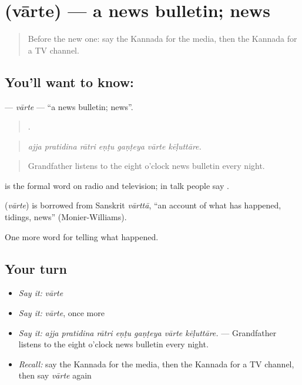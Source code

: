\section[\texorpdfstring{\kn{ವಾರ್ತೆ} (vārte)}{ವಾರ್ತೆ (vārte)}]{ (vārte) — a news bulletin; news}

\label{lesson:KA-C329-varte}



\begin{quote}
Before the new one: say the Kannada for the media, then the Kannada for a TV channel.
\end{quote}

\subsection*{You'll want to know: }
\textbf{} — \emph{vārte} — \textquotedblleft{}a news bulletin; news\textquotedblright{}.

\begin{quote}
      .
\end{quote}

\begin{quote}
\emph{ajja pratidina rātri eṇṭu gaṇṭeya vārte kēḷuttāre.}
\end{quote}

\begin{quote}
Grandfather listens to the eight o'clock news bulletin every night.
\end{quote}

 is the formal word on radio and television; in talk people say .

\begin{cousinweb}
\textbf{} (\emph{vārte}) is borrowed from Sanskrit \emph{vārttā}, \textquotedblleft{}an account of what has happened, tidings, news\textquotedblright{} (Monier-Williams).
\end{cousinweb}

\begin{grammarlens}[title={What you've built}]
One more word for telling what happened.
\end{grammarlens}

\subsection*{Your turn}
\begin{itemize}
\raggedright
  \item \emph{Say it:} \emph{vārte}
  \item \emph{Say it:} \emph{vārte}, once more
  \item \emph{Say it:} \emph{ajja pratidina rātri eṇṭu gaṇṭeya vārte kēḷuttāre.} — Grandfather listens to the eight o'clock news bulletin every night.
  \item \emph{Recall:} say the Kannada for the media, then the Kannada for a TV channel, then say \emph{vārte} again
\end{itemize}

